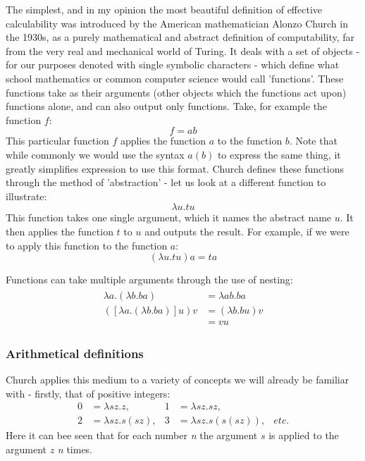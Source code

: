 \documentclass[Master.tex]{subfiles}
\begin{document}
The simplest, and in my opinion the most beautiful definition of effective calculability was introduced by the American mathematician Alonzo Church in the 1930s, as a purely mathematical and abstract definition of computability, far from the very real and mechanical world of Turing. It deals with a set of objects - for our purposes denoted with single symbolic characters - which define what school mathematics or common computer science would call 'functions'. These functions take as their arguments (other objects which the functions act upon) functions alone, and can also output only functions. Take, for example the function $f$:
\begin{equation*}
f = ab
\end{equation*}
This particular function $f$ applies the function $a$ to the function $b$. Note that while commonly we would use the syntax $a(b)$ to express the same thing, it greatly simplifies expression to use this format. Church defines these functions through the method of 'abstraction' - let us look at a different function to illustrate:
\begin{equation*}
\lambda u.tu
\end{equation*}
This function takes one single argument, which it names the abstract name $u$. It then applies the function $t$ to $u$ and outputs the result. For example, if we were to apply this function to the function $a$:
\begin{equation*}
(\lambda u.tu) a = ta	
\end{equation*}

Functions can take multiple arguments through the use of nesting:
\begin{gather*}
\begin{aligned}
\lambda a.(\lambda b.ba) &=  \lambda ab.ba \\
([\lambda a.(\lambda b.ba)]u)v &= (\lambda b.bu)v \\ &= vu
\end{aligned}
\end{gather*}

\subsubsection{Arithmetical definitions}

Church applies this medium to a variety of concepts we will already be familiar with - firstly, that of positive integers:
\begin{equation*}
\begin{aligned}
\bm{\mathrm{0}} &= \lambda sz.z,
  & %
\bm{\mathrm{1}} &= \lambda sz.sz,
  \\
\bm{\mathrm{2}} &= \lambda sz.s(sz),
  &
\bm{\mathrm{3}} &= \lambda sz.s(s(sz)),
  &
etc.
\end{aligned}
\end{equation*}
Here it can bee seen that for each number \textit{n} the argument $s$  is applied to the argument $z$ \textit{n} times.
\end{document}
